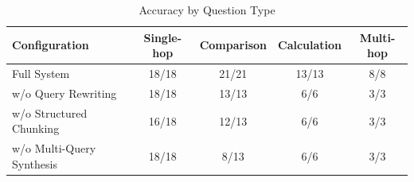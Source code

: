 \begin{table}[h]
\centering
\caption{Accuracy by Question Type}
\label{tab:qtype}
\begin{tabular}{lcccc}
\toprule
\textbf{Configuration} & \textbf{Single-hop} & \textbf{Comparison} & \textbf{Calculation} & \textbf{Multi-hop} \\
\midrule
Full System & 18/18 & 21/21 & 13/13 & 8/8 \\
w/o Query Rewriting & 18/18 & 13/13 & 6/6 & 3/3 \\
w/o Structured Chunking & 16/18 & 12/13 & 6/6 & 3/3 \\
w/o Multi-Query Synthesis & 18/18 & 8/13 & 6/6 & 3/3 \\
\bottomrule
\end{tabular}
\end{table}